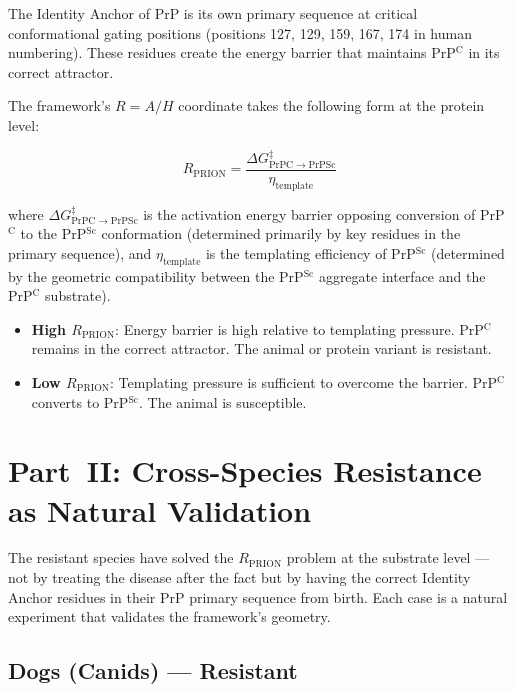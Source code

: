 \documentclass[12pt,a4paper]{article}
\newcommand{\rprion}{$R_{\mathrm{PRION}}$}
\newcommand{\prpc}{PrP$^{\mathrm{C}}$}
\newcommand{\prpsc}{PrP$^{\mathrm{Sc}}$}
\begin{document}
The Identity Anchor of PrP is its own primary sequence at critical
conformational gating positions (positions 127, 129, 159, 167, 174 in human
numbering). These residues create the energy barrier that maintains \prpc{}
in its correct attractor.

The framework's $R = A/H$ coordinate takes the following form at the protein
level:

\begin{equation}
  R_{\mathrm{PRION}} = \frac{\Delta G^{\ddagger}_{\mathrm{PrPC \to PrPSc}}}
  {\eta_{\mathrm{template}}}
\end{equation}

where $\Delta G^{\ddagger}_{\mathrm{PrPC \to PrPSc}}$ is the activation
energy barrier opposing conversion of \prpc{} to the \prpsc{} conformation
(determined primarily by key residues in the primary sequence), and
$\eta_{\mathrm{template}}$ is the templating efficiency of \prpsc{}
(determined by the geometric compatibility between the \prpsc{} aggregate
interface and the \prpc{} substrate).

\begin{itemize}
  \item \textbf{High \rprion{}}: Energy barrier is high relative to templating
    pressure. \prpc{} remains in the correct attractor. The animal or protein
    variant is resistant.
  \item \textbf{Low \rprion{}}: Templating pressure is sufficient to overcome
    the barrier. \prpc{} converts to \prpsc{}. The animal is susceptible.
\end{itemize}

\section{Part~II: Cross-Species Resistance as Natural Validation}

The resistant species have solved the \rprion{} problem at the substrate
level --- not by treating the disease after the fact but by having the
correct Identity Anchor residues in their PrP primary sequence from birth.
Each case is a natural experiment that validates the framework's geometry.

\subsection{Dogs (Canids) --- Resistant}
\end{document}
